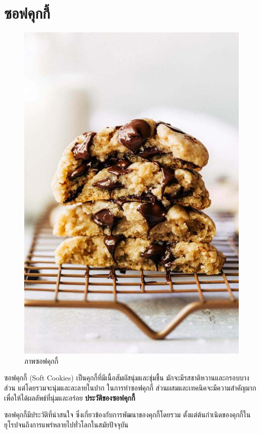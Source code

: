 \documentclass{report}
\begin{document}
\section{ซอฟคุกกี้}
\begin{figure}[h!]
	\centering
	\includegraphics[scale=0.25]{aa.jpg}
	\caption{ภาพซอฟคุกกี้ \cite{YOYO}}
	\label{fig:graph1} 
\end{figure}
ซอฟคุกกี้ (Soft Cookies) เป็นคุกกี้ที่มีเนื้อสัมผัสนุ่มและชุ่มชื้น มักจะมีรสชาติหวานและกรอบบางส่วน แต่โดยรวมจะนุ่มและละลายในปาก ในการทำซอฟคุกกี้ ส่วนผสมและเทคนิคจะมีความสำคัญมาก เพื่อให้ได้ผลลัพธ์ที่นุ่มและอร่อย
\textbf{ประวัติของซอฟคุกกี้}  \par 
ซอฟคุกกี้มีประวัติที่น่าสนใจ ซึ่งเกี่ยวข้องกับการพัฒนาของคุกกี้โดยรวม ตั้งแต่ต้นกำเนิดของคุกกี้ในยุโรปจนถึงการแพร่หลายไปทั่วโลกในสมัยปัจจุบัน
\end{document}
